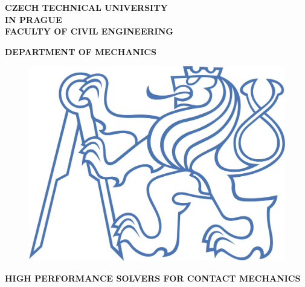 \documentclass{article}
\begin{document}
\pagestyle{empty}


 


\begin{Large}

\begin{center}

\textbf{CZECH TECHNICAL UNIVERSITY 
\\
IN PRAGUE
\\
FACULTY OF CIVIL ENGINEERING}

\vspace{1cm}

\textbf{DEPARTMENT OF MECHANICS}

\end{center}


\vspace{1cm}

\begin{figure}[h]

\centering
  
\includegraphics[scale=0.4]{lev.jpg}

\end{figure} 

\begin{center}

\vspace{1cm}

\textbf{HIGH PERFORMANCE SOLVERS FOR CONTACT MECHANICS}

\vspace{1cm}



\end{center}
\end{Large}
\end{document}
